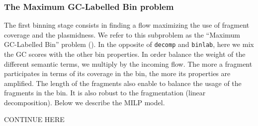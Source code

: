 \subsubsection{The Maximum GC-Labelled Bin problem \MGCLB{}}\label{sec:pbf_iterbin:once:mgclb}

The first binning stage consists in finding a flow maximizing the use of fragment coverage and the plasmidness.
We refer to this subproblem as the \enquote{Maximum GC-Labelled Bin} problem (\MGCLB{}).
In the opposite of \texttt{decomp} and \texttt{binlab}, here we mix the GC scores with the other bin properties.
In order  balance the weight of the different semantic terms, we multiply by the incoming flow.
The more a fragment participates in terms of its coverage in the bin, the more its properties are amplified.
The length of the fragments also enable to balance the usage of the fragments in the bin.
It is also robust to the fragmentation (linear decomposition).
Below we describe the MILP model.

\begin{todobox}
  CONTINUE HERE %
\end{todobox}

